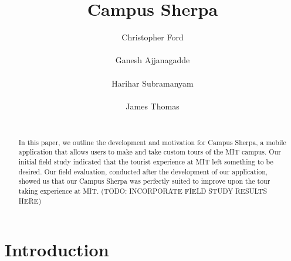 \documentclass{sigchi}
\begin{document}
\title{Campus Sherpa}

\author{
  \alignauthor Christopher Ford\\
    \\
  \alignauthor Ganesh Ajjanagadde\\
    \\  
  \alignauthor Harihar Subramanyam\\
    \\
   \alignauthor James Thomas\\
    \\
}

\maketitle

\begin{abstract}
In this paper, we outline the development and motivation for Campus Sherpa, a mobile application that allows users to make and take custom tours of the MIT campus. Our initial field study indicated that the tourist experience at MIT left something to be desired. Our field evaluation, conducted after the development of our application, showed us that our Campus Sherpa was perfectly suited to improve upon the tour taking experience at MIT. (TODO: INCORPORATE FIELD STUDY RESULTS HERE)

\end{abstract}


%
%

\section{Introduction}
\end{document}
